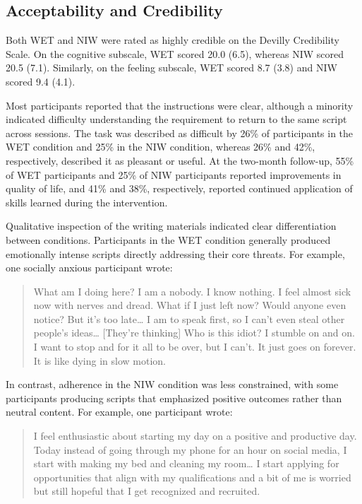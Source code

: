 \documentclass[
  man,floatsintext]{apa7}
\begin{document}
\subsection{Acceptability and Credibility}\label{acceptability-and-credibility}

Both WET and NIW were rated as highly credible on the Devilly Credibility Scale.
On the cognitive subscale, WET scored 20.0 (6.5), whereas NIW scored 20.5 (7.1).
Similarly, on the feeling subscale, WET scored 8.7 (3.8) and NIW scored 9.4 (4.1).

Most participants reported that the instructions were clear, although a minority indicated difficulty understanding the requirement to return to the same script across sessions.
The task was described as difficult by 26\% of participants in the WET condition and 25\% in the NIW condition, whereas 26\% and 42\%, respectively, described it as pleasant or useful.
At the two-month follow-up, 55\% of WET participants and 25\% of NIW participants reported improvements in quality of life, and 41\% and 38\%, respectively, reported continued application of skills learned during the intervention.

Qualitative inspection of the writing materials indicated clear differentiation between conditions. Participants in the WET condition generally produced emotionally intense scripts directly addressing their core threats. For example, one socially anxious participant wrote:

\begin{quote}
What am I doing here? I am a nobody. I know nothing. I feel almost sick now with nerves and dread. What if I just left now? Would anyone even notice? But it's too late\ldots{}
I am to speak first, so I can't even steal other people's ideas\ldots{}
{[}They're thinking{]} Who is this idiot? I stumble on and on. I want to stop and for it all to be over, but I can't. It just goes on forever. It is like dying in slow motion.
\end{quote}

In contrast, adherence in the NIW condition was less constrained, with some participants producing scripts that emphasized positive outcomes rather than neutral content. For example, one participant wrote:

\begin{quote}
I feel enthusiastic about starting my day on a positive and productive day.
Today instead of going through my phone for an hour on social media, I start with making my bed and cleaning my room\ldots{}
I start applying for opportunities that align with my qualifications and a bit of me is worried but still hopeful that I get recognized and recruited.
\end{quote}
\end{document}
